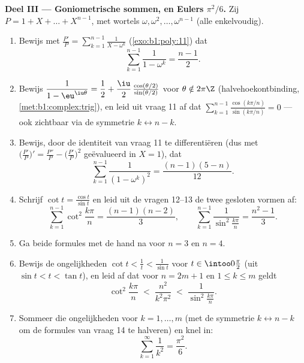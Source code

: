 \begin{problem}
\medskip
\noindent\textbf{Deel III --- Goniometrische sommen, en Eulers
$\pi^2/6$.} Zij $P = 1 + X + \dots + X^{n-1}$, met wortels $\omega,
\omega^2, \dots, \omega^{n-1}$ (alle enkelvoudig).
\begin{enumerate}[resume]
  \item Bewijs met $\frac{P'}P = \sum_{k=1}^{n-1}\frac1{X - \omega^k}$
        (\cref{exo:b1:poly:11}) dat
        \[
        \sum_{k=1}^{n-1}\frac{1}{1 - \omega^k} = \frac{n-1}2 .
        \]
  \item Bewijs $\dfrac1{1 - \eu^{\iu\theta}} = \dfrac12 +
        \dfrac\iu2\,\frac{\cos(\theta/2)}{\sin(\theta/2)}$ voor $\theta
        \notin 2\pi\Z$ (halvehoekontbinding,
        \cref{met:b1:complex:trig}), en leid uit vraag 11 af dat
        $\sum_{k=1}^{n-1} \frac{\cos(k\pi/n)}{\sin(k\pi/n)} = 0$ ---
        ook zichtbaar via de symmetrie $k \leftrightarrow n - k$.
  \item Bewijs, door de identiteit van vraag 11 te differentiëren (dus
        met $\bigl(\frac{P'}P\bigr)' = \frac{P''}P -
        \bigl(\frac{P'}P\bigr)^2$ geëvalueerd in $X = 1$), dat
        \[
        \sum_{k=1}^{n-1}\frac{1}{(1 - \omega^k)^2}
        = \frac{(n-1)(5-n)}{12} .
        \]
  \item Schrijf $\cot t = \frac{\cos t}{\sin t}$ en leid uit de vragen
        12--13 de twee gesloten vormen af:
        \[
        \sum_{k=1}^{n-1}\cot^2\frac{k\pi}n = \frac{(n-1)(n-2)}3,
        \qquad
        \sum_{k=1}^{n-1}\frac1{\sin^2\frac{k\pi}n}
        = \frac{n^2-1}3 .
        \]
  \item Ga beide formules met de hand na voor $n = 3$ en $n = 4$.
  \item Bewijs de ongelijkheden $\cot t < \frac1t < \frac1{\sin t}$ voor
        $t \in \intoo0{\frac\pi2}$ (uit $\sin t < t < \tan t$), en leid
        af dat voor $n = 2m + 1$ en $1 \leq k \leq m$ geldt
        \[
        \cot^2\frac{k\pi}n \;<\; \frac{n^2}{k^2\pi^2}
        \;<\; \frac1{\sin^2\frac{k\pi}n} .
        \]
  \item Sommeer die ongelijkheden voor $k = 1, \dots, m$ (met de
        symmetrie $k \leftrightarrow n - k$ om de formules van vraag 14
        te halveren) en knel in:
        \[
        \sum_{k=1}^{\infty}\frac1{k^2} = \frac{\pi^2}6 .
        \]
\end{enumerate}


\end{problem}
